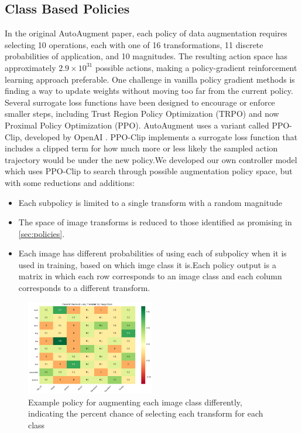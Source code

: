 \documentclass[10pt,twocolumn,letterpaper]{article}
\begin{document}
    

  \subsection{Class Based Policies}

    In the original AutoAugment paper, each policy of data augmentation requires selecting 10 operations, each with one of 16 transformations, 11 discrete probabilities of application, and 10 magnitudes. The resulting action space has approximately $2.9 \times 10^{31}$ possible actions, making a policy-gradient reinforcement learning approach preferable. One challenge in vanilla policy gradient methods is finding a way to update weights without moving too far from the current policy. Several surrogate loss functions have been designed to encourage or enforce smaller steps, including Trust Region Policy Optimization (TRPO) and now Proximal Policy Optimization (PPO). AutoAugment uses a variant called PPO-Clip, developed by OpenAI \cite{Schulman2017}. PPO-Clip implements a surrogate loss function that includes a clipped term for how much more or less likely the sampled action trajectory would be under the new policy.We developed our own controller model which uses PPO-Clip to search through possible augmentation policy space, but with some reductions and additions:

    \begin{itemize}
      \item 
        Each subpolicy is limited to a single transform with a random magnitude
      \item 
        The space of image transforms is reduced to those identified as promising in \autoref{sec:policies}.
      \item 
        Each image has different probabilities of using each of subpolicy when it is used in training, based on which imge class it is.Each policy output is a matrix in which each row corresponds to an image class and each column corresponds to a different transform.
    \end{itemize}


    \begin{figure}[h]
    \begin{center}
    \includegraphics[width=0.5\textwidth]{heatmap2.png}
    \end{center}
    \caption{Example policy for augmenting each image class differently, indicating the percent chance of selecting each transform for each class}
    \label{fig:heatmap2}
    \end{figure}
\end{document}
